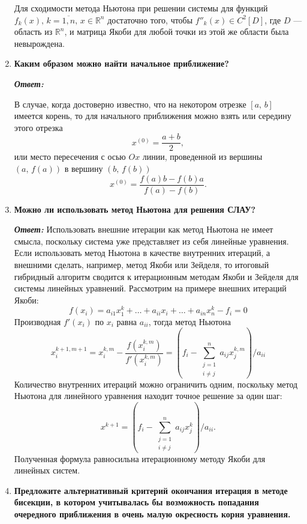 \documentclass[12pt, a4paper]{article}
\begin{document}
\begin{enumerate}
		Для сходимости метода Ньютона при решении системы для функций $f_k(x), \, k = \overline{1, n}, \, x \in \mathbb{R}^n$ достаточно того, чтобы $f''_k(x) \in C^2[D]$, где $D$ --- область из $\mathbb{R}^n$, и матрица Якоби для любой точки из этой же области была невырождена.

		\item \textbf{Каким образом можно найти начальное приближение?}
		\vspace*{0.2cm}
		
		\textit{\textbf{Ответ:}}

		В случае, когда достоверно известно, что на некотором отрезке $[a, \, b]$ имеется корень, то для начального приближения можно взять или середину этого отрезка 
		\[
		x^{(0)} = \frac {a + b} 2,
		\]
		или место пересечения с осью $Ox$ линии, проведенной из вершины $(a, \, f(a))$ в вершину $(b, \, f(b))$
		\[
		x^{(0)} = \frac {f(a)b - f(b)a} {f(a) - f(b)}.
		\]

		\item \textbf{Можно ли использовать метод Ньютона для решения СЛАУ?}
		\vspace*{0.2cm}
		
		\textit{\textbf{Ответ:}}
		 Использовать внешние итерации как метод Ньютона не имеет смысла, поскольку система уже представляет из себя линейные уравнения. Если использовать метод Ньютона в качестве внутренних итераций, а внешними сделать, например, метод Якоби или Зейделя, то итоговый гибридный алгоритм сводится к итерационным методам Якоби и Зейделя для системы линейных уравнений. Рассмотрим на примере внешних итераций Якоби:
		 \[
		 f(x_{i}) = a_{i 1}x_1^k + \ldots + a_{i i}x_i + \ldots +  a_{i n}x_n^{k} - f_i = 0
		 \]
		 Производная $f'(x_{i})$ по $x_i$ равна $a_{ii}$, тогда метод Ньютона
		 \[
		 x^{k+1, m+1}_i = x^{k, m}_{i} - \dfrac{f(x^{k, m}_i)}{f'(x^{k, m}_i)} = (f_i - \sum\limits^{n}_{\substack{j = 1 \\ i \ne j}} a_{ij} x_j^{k, m})/a_{ii}
		 \]
		 Количество внутренних итераций можно ограничить одним, поскольку метод Ньютона для линейного уравнения находит точное решение за один шаг:
		 \[
		  x^{k+1} = (f_i - \sum\limits^{n}_{\substack{j = 1 \\ i \ne j}} a_{ij} x_j^{k})/a_{ii}.
		 \]
		 Полученная формула равносильна итерационному методу Якоби для линейных систем.
		 
		\item \textbf{Предложите альтернативный критерий окончания итерация в методе бисекции, в котором учитывалась бы возможность попадания очередного приближения в очень малую окресность корня уравнения.}
		\vspace*{0.2cm}
		

\end{enumerate}
\end{document}
